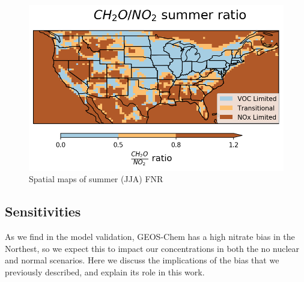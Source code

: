 \documentclass[12]{article}
\begin{document}
\begin{figure}
    \centering
    \includegraphics[scale=0.4]{ego_nonuclear_project/Figures/summer_regime_national_ratio.png}
    \caption{Spatial maps of summer (JJA) FNR} 
    \label{fig:summer_FNR}
\end{figure}
\subsection{ Sensitivities}
As we find in the model validation, GEOS-Chem has a high nitrate bias in the Northest, so we expect this to impact our  concentrations in both the no nuclear and normal scenarios. Here we discuss the implications of the bias that we previously described, and explain its role in this work.
\end{document}

